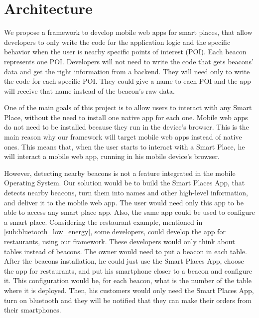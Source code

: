 
% 
% 

\section{Architecture}
\label{sec:architecture}
We propose a framework to develop mobile web apps for smart
places, that allow developers to only write the code
for the application logic and the specific behavior when
the user is nearby specific points of interest (POI).
Each beacon represents one POI. Developers will not need
to write the code that gets beacons' data and get the
right information from a backend. They will need only
to write the code for each specific POI. They could give
a name to each POI and the app will receive that name 
instead of the beacon's raw data. 

One of the main goals of this project is to allow
users to interact with any Smart Place, without
the need to install one native app for each one.
Mobile web apps do not need to be installed because
they run in the device's browser.
This is the main reason why our framework will
target mobile web apps instead of native ones.
This means that, when the user starts to interact
with a Smart Place, he will interact a mobile
web app, running in his mobile device's browser.

However, detecting
nearby beacons is not a feature integrated in the mobile
Operating System. Our solution would be to build the
Smart Places App,
that detects nearby beacons, turn them into names and
other high-level information, and deliver it to the
mobile web app. The user would need only this app to
be able to access any smart place app. Also, the same app
could be used to configure a smart place.
Considering the restaurant example, mentioned in
\ref{sub:bluetooth_low_energy}, some
developers, could develop the app for restaurants,
using our framework. These developers would only think
about tables instead of beacons. The owner would need
to put a beacon in each table. After the beacons
installation, he could just use the Smart Places App,
choose the app for restaurants, and put his smartphone
closer to a beacon and configure it. This configuration
would be, for each beacon, what is the number of the table
where it is deployed. Then, his customers would only
need the Smart Places App, turn on bluetooth and they will
be notified that they can make their orders from their
smartphones.

